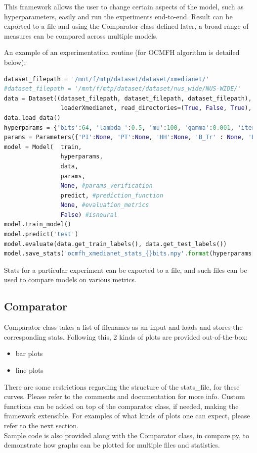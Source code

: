 \documentclass[10pt]{scrartcl}
\begin{document}
This framework allows the user to change certain aspects of the model, such as hyperparameters, easily and run the experiments end-to-end. Result can be exported to a file and using the Comparator class defined later, a broad range of measures can be compared across multiple models.

An example of an experimentation routine (for OCMFH algorithm is detailed below):
\begin{lstlisting}[language=Python, caption=Model training]
dataset_filepath = '/mnt/f/mtp/dataset/dataset/xmedianet/'
#dataset_filepath = '/mnt/f/mtp/dataset/dataset/nus_wide/NUS-WIDE/'
data = Dataset((dataset_filepath, dataset_filepath, dataset_filepath), 
				loaderXmedianet, read_directories=(True, False, True), summarize=summarizeDataset)
data.load_data()
hyperparams = {'bits':64, 'lambda_':0.5, 'mu':100, 'gamma':0.001, 'iter':100, 'cmfhiter':100}
params = Parameters({'PI':None, 'PT':None, 'HH':None, 'B_Tr' : None, 'B_Ir' : None, 'B_Te' : None, 'B_Ie' : None})
model = Model(	train, 
				hyperparams, 
				data, 
				params, 
				None, #params_verification 
				predict, #prediction_function
				None, #evaluation_metrics
				False) #isneural
model.train_model()
model.predict('test')
model.evaluate(data.get_train_labels(), data.get_test_labels())
model.save_stats('ocmfh_xmedianet_stats_{}bits.npy'.format(hyperparams['bits']))
\end{lstlisting}
Stats for a particular experiment can be exported to a file, and such files can be used to compare models on various metrics. 
\subsection{Comparator}
Comparator class takes a list of filenames as an input and loads and stores the corresponding stats.
Following this, 2 kinds of plots are provided out-of-the-box:
\begin{itemize}
    \item bar plots
    \item line plots
\end{itemize}
There are some restrictions regarding the structure of the stats\_file, for these curves. Please refer to the comments and documentation for more info. Custom functions can be added on top of the comparator class, if needed, making the framework extensible. For examples of what kinds of plots one can expect, please refer to the next section.\\
Sample code is also provided along with the Comparator class, in compare.py, to demonstrate how graphs can be plotted for multiple files and statistics.
\end{document}
